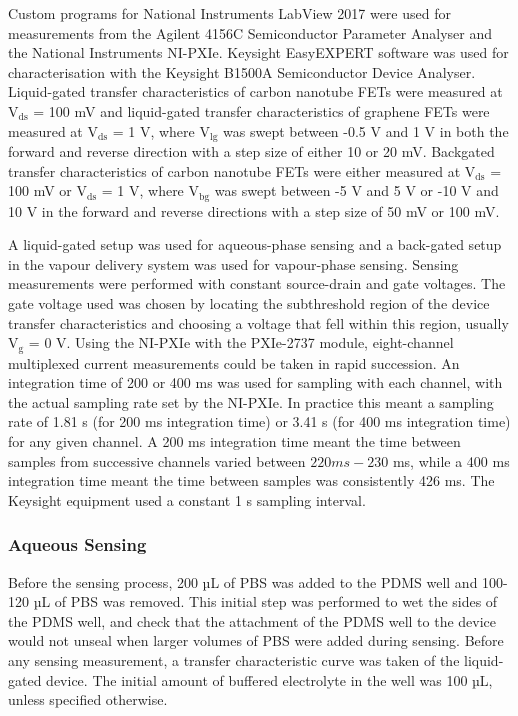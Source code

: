 \documentclass[
  a4paper,
]{scrbook}
\begin{document}
Custom programs for National Instruments LabView 2017 were used for
measurements from the Agilent 4156C Semiconductor Parameter Analyser and
the National Instruments NI-PXIe. Keysight EasyEXPERT software was used
for characterisation with the Keysight B1500A Semiconductor Device
Analyser. Liquid-gated transfer characteristics of carbon nanotube FETs
were measured at V\(_{\mathrm{ds}}\) = 100 mV and liquid-gated transfer
characteristics of graphene FETs were measured at V\(_{\mathrm{ds}}\) =
1 V, where V\(_{\mathrm{lg}}\) was swept between -0.5 V and 1 V in both
the forward and reverse direction with a step size of either 10 or 20
mV. Backgated transfer characteristics of carbon nanotube FETs were
either measured at V\(_{\mathrm{ds}}\) = 100 mV or V\(_{\mathrm{ds}}\) =
1 V, where V\(_{\mathrm{bg}}\) was swept between -5 V and 5 V or -10 V
and 10 V in the forward and reverse directions with a step size of 50 mV
or 100 mV.

A liquid-gated setup was used for aqueous-phase sensing and a back-gated
setup in the vapour delivery system was used for vapour-phase sensing.
Sensing measurements were performed with constant source-drain and gate
voltages. The gate voltage used was chosen by locating the subthreshold
region of the device transfer characteristics and choosing a voltage
that fell within this region, usually V\(_{\mathrm{g}}\) = 0 V. Using
the NI-PXIe with the PXIe-2737 module, eight-channel multiplexed current
measurements could be taken in rapid succession. An integration time of
200 or 400 ms was used for sampling with each channel, with the actual
sampling rate set by the NI-PXIe. In practice this meant a sampling rate
of 1.81 s (for 200 ms integration time) or 3.41 s (for 400 ms
integration time) for any given channel. A 200 ms integration time meant
the time between samples from successive channels varied between
\(220 ms-230\) ms, while a 400 ms integration time meant the time
between samples was consistently 426 ms. The Keysight equipment used a
constant 1 s sampling interval.

\hypertarget{aqueous-sensing}{%
\subsubsection*{Aqueous Sensing}\label{aqueous-sensing}}

Before the sensing process, 200 µL of PBS was added to the PDMS well and
100-120 µL of PBS was removed. This initial step was performed to wet
the sides of the PDMS well, and check that the attachment of the PDMS
well to the device would not unseal when larger volumes of PBS were
added during sensing. Before any sensing measurement, a transfer
characteristic curve was taken of the liquid-gated device. The initial
amount of buffered electrolyte in the well was 100 µL, unless specified
otherwise.
\end{document}

